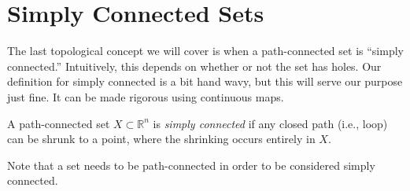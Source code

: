 \documentclass{ximera}
\begin{document}
\section{Simply Connected Sets}

The last topological concept we will cover is when a path-connected set is ``simply connected.'' Intuitively, this depends on whether or not the set has holes. Our definition for simply connected is a bit hand wavy, but this will serve our purpose just fine. It can be made rigorous using continuous maps. %

\begin{definition}
A path-connected set $X\subset\mathbb{R}^n$ is \emph{simply connected} if any closed path (i.e., loop) can be shrunk to a point, where the shrinking occurs entirely in $X$.
\end{definition}


Note that a set needs to be path-connected in order to be considered simply connected.
\end{document}
